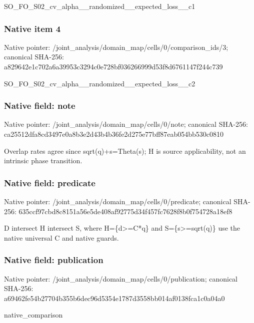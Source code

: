 \documentclass[10pt,a4paper]{article}
\begin{document}
SO\_FO\_S02\_cv\_alpha\_\_rand\allowbreak{}omized\_\_expected\_loss\_\_c\allowbreak{}1


\subsubsection{Native item 4}


Native pointer: /joint\_analysis/domain\_m\allowbreak{}ap/cells/0/comparison\_id\allowbreak{}s/3; canonical SHA-256: a829642e1c702a6a39953c32\allowbreak{}94c0e728bf036266999d53f8\allowbreak{}d6761147f244c739


SO\_FO\_S02\_cv\_alpha\_\_rand\allowbreak{}omized\_\_expected\_loss\_\_c\allowbreak{}2


\subsubsection{Native field: note}


Native pointer: /joint\_analysis/domain\_map/cells/0/note; canonical SHA-256: ca25512dfa8cd3497e0a8b3e\allowbreak{}2d43b4b36fe2d275e77bff87\allowbreak{}eab054bb530c0810


Overlap rates agree since sqrt(q)+s=Theta(s); H is source applicability, not an intrinsic phase transition.


\subsubsection{Native field: predicate}


Native pointer: /joint\_analysis/domain\_m\allowbreak{}ap/cells/0/predicate; canonical SHA-256: 635ccf97cbd8c8151a56e5de\allowbreak{}408af92775d34f457fc7628f\allowbreak{}8b0f754728a18ef8


D intersect H intersect S, where H=\{d>=C*q\} and S=\{s>=sqrt(q)\} use the native universal C and native guards.


\subsubsection{Native field: publication}


Native pointer: /joint\_analysis/domain\_m\allowbreak{}ap/cells/0/publication; canonical SHA-256: a69462fe54b27704b355b6de\allowbreak{}c96d5354e1787d3558bb014a\allowbreak{}f0138fca1c0a04a0


native\_comparison
\end{document}
